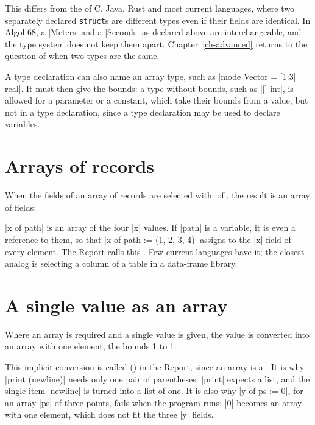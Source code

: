 
This  differs from the 
of C, Java, Rust and most current languages, where two separately
declared \texttt{struct}s are different types even if their fields are
identical. In Algol 68, a \code|Meters| and a \code|Seconds| as declared
above are interchangeable, and the type system does not keep them apart.
Chapter~\ref{ch-advanced} returns to the question of when two types are the same.

A type declaration can also name an array type, such as
\code|mode Vector = [1:3] real|. It must then give the bounds: a type
without bounds, such as \code|[] int|, is allowed for a parameter or a
constant, which take their bounds from a value, but not in a type
declaration, since a type declaration may be used to declare variables.

\section{Arrays of records}\label{sec-multiple-selection}

When the fields of an array of records are selected with \code|of|, the
result is an array of fields:


\code|x of path| is an array of the four \code|x| values. If \code|path|
is a variable, it is even a reference to them, so that
\code|x of path := (1, 2, 3, 4)| assigns to the \code|x| field of every
element. The Report calls this . Few current
languages have it; the closest analog is selecting a column of a table
in a data-frame library.

\section{A single value as an array}\label{sec-rowing}

Where an array is required and a single value is given, the value is
converted into an array with one element, the bounds 1 to 1:


This implicit conversion is called  () in the
Report, since an array is a . It is why \code|print (newline)|
needs only one pair of parentheses: \code|print| expects a list, and the
single item \code|newline| is turned into a list of one. It is also why
\code|y of ps := 0|, for an array \code|ps| of three points, fails when
the program runs: \code|0| becomes an array with one element, which does
not fit the three \code|y| fields.

